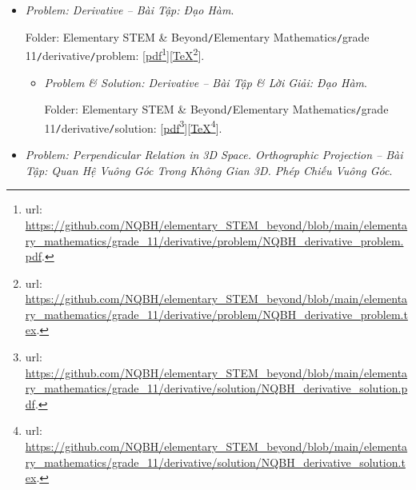 \documentclass[12pt]{article}
\begin{document}
\begin{itemize}
\begin{itemize}
		Folder: {\sf Elementary STEM \& Beyond{\tt/}Elementary Mathematics{\tt/}grade 11{\tt/}exp log {\tt/}solution}: [\href{https://github.com/NQBH/elementary_STEM_beyond/blob/main/elementary_mathematics/grade_11/exponentiation_logarithm/solution/NQBH_exponentiation_logarithm_solution.pdf}{pdf}\footnote{{\sc url}: \url{https://github.com/NQBH/elementary_STEM_beyond/blob/main/elementary_mathematics/grade_11/exponentiation_logarithm/solution/NQBH_exponentiation_logarithm_solution.pdf}.}][\href{https://github.com/NQBH/elementary_STEM_beyond/blob/main/elementary_mathematics/grade_11/exponentiation_logarithm/solution/NQBH_exponentiation_logarithm_solution.tex}{\TeX}\footnote{{\sc url}: \url{https://github.com/NQBH/elementary_STEM_beyond/blob/main/elementary_mathematics/grade_11/exponentiation_logarithm/solution/NQBH_exponentiation_logarithm_solution.tex}.}].
	\end{itemize}
	\item {\it Problem: Derivative -- Bài Tập: Đạo Hàm}.
	
	Folder: {\sf Elementary STEM \& Beyond{\tt/}Elementary Mathematics{\tt/}grade 11{\tt/}derivative{\tt/}problem}: [\href{https://github.com/NQBH/elementary_STEM_beyond/blob/main/elementary_mathematics/grade_11/derivative/problem/NQBH_derivative_problem.pdf}{pdf}\footnote{{\sc url}: \url{https://github.com/NQBH/elementary_STEM_beyond/blob/main/elementary_mathematics/grade_11/derivative/problem/NQBH_derivative_problem.pdf}.}][\href{https://github.com/NQBH/elementary_STEM_beyond/blob/main/elementary_mathematics/grade_11/derivative/problem/NQBH_derivative_problem.tex}{\TeX}\footnote{{\sc url}: \url{https://github.com/NQBH/elementary_STEM_beyond/blob/main/elementary_mathematics/grade_11/derivative/problem/NQBH_derivative_problem.tex}.}].
	\begin{itemize}
		\item {\it Problem \& Solution: Derivative -- Bài Tập \& Lời Giải: Đạo Hàm}.
		
		Folder: {\sf Elementary STEM \& Beyond{\tt/}Elementary Mathematics{\tt/}grade 11{\tt/}derivative{\tt/}solution}: [\href{https://github.com/NQBH/elementary_STEM_beyond/blob/main/elementary_mathematics/grade_11/derivative/solution/NQBH_derivative_solution.pdf}{pdf}\footnote{{\sc url}: \url{https://github.com/NQBH/elementary_STEM_beyond/blob/main/elementary_mathematics/grade_11/derivative/solution/NQBH_derivative_solution.pdf}.}][\href{https://github.com/NQBH/elementary_STEM_beyond/blob/main/elementary_mathematics/grade_11/derivative/solution/NQBH_derivative_solution.tex}{\TeX}\footnote{{\sc url}: \url{https://github.com/NQBH/elementary_STEM_beyond/blob/main/elementary_mathematics/grade_11/derivative/solution/NQBH_derivative_solution.tex}.}].
	\end{itemize}
	\item {\it Problem: Perpendicular Relation in 3D Space. Orthographic Projection -- Bài Tập: Quan Hệ Vuông Góc Trong Không Gian 3D. Phép Chiếu Vuông Góc}.
	

\end{itemize}
\end{document}
